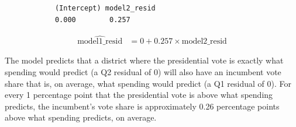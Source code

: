\documentclass[12pt,letterpaper]{article}
\begin{document}
\begin{enumerate}
		
		\begin{verbatim}
			(Intercept) model2_resid 
			0.000        0.257 
		\end{verbatim}
		
		\begin{align*}
			\widehat{\text{model1\_resid}} &= 0 + 0.257 \times \text{model2\_resid}
		\end{align*}
		
		\noindent The model predicts that a district where the presidential vote is exactly what spending would predict (a Q2 residual of 0) will also have an incumbent vote share that is, on average, what spending would predict (a Q1 residual of 0). For every 1 percentage point that the presidential vote is above what spending predicts, the incumbent's vote share is approximately 0.26 percentage points above what spending predicts, on average.
		
	\end{enumerate}
	
	\newpage	
\end{document}
